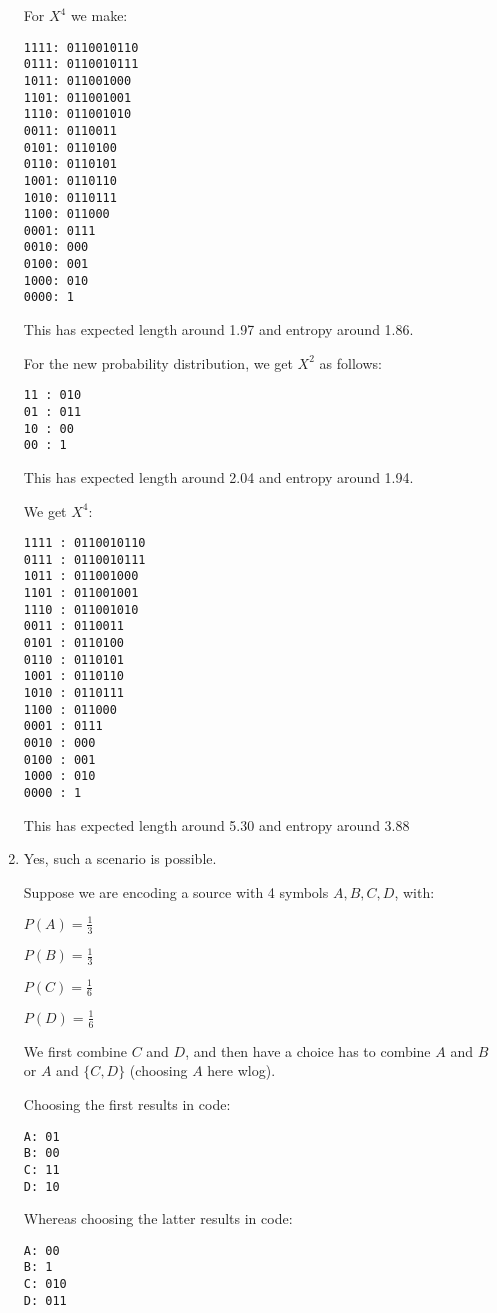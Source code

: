\begin{enumerate}
For $X^4$ we make:

\begin{verbatim}
1111: 0110010110
0111: 0110010111
1011: 011001000
1101: 011001001
1110: 011001010
0011: 0110011
0101: 0110100
0110: 0110101
1001: 0110110
1010: 0110111
1100: 011000
0001: 0111
0010: 000
0100: 001
1000: 010
0000: 1
\end{verbatim}

This has expected length around 1.97 and entropy around 1.86.

For the new probability distribution, we get $X^2$ as follows:

\begin{verbatim}
11 : 010
01 : 011
10 : 00
00 : 1
\end{verbatim}

This has expected length around 2.04 and entropy around 1.94.

We get $X^4$:


\begin{verbatim}
1111 : 0110010110
0111 : 0110010111
1011 : 011001000
1101 : 011001001
1110 : 011001010
0011 : 0110011
0101 : 0110100
0110 : 0110101
1001 : 0110110
1010 : 0110111
1100 : 011000
0001 : 0111
0010 : 000
0100 : 001
1000 : 010
0000 : 1
\end{verbatim}

This has expected length around 5.30 and entropy around 3.88

\item

  Yes, such a scenario is possible.

  Suppose we are encoding a source with 4 symbols $A,B,C,D$, with:

  $P(A) = \frac{1}{3}$
  
  $P(B) = \frac{1}{3}$

  $P(C) = \frac{1}{6}$

  $P(D) = \frac{1}{6}$

  We first combine $C$ and $D$, and then have a choice has to combine $A$ and $B$ or $A$ and $\{C,D\}$ (choosing $A$ here wlog).

  Choosing the first results in code:

\begin{verbatim}
A: 01
B: 00
C: 11
D: 10
\end{verbatim}

Whereas choosing the latter results in code:

\begin{verbatim}
A: 00
B: 1
C: 010
D: 011
\end{verbatim}


\end{enumerate}
